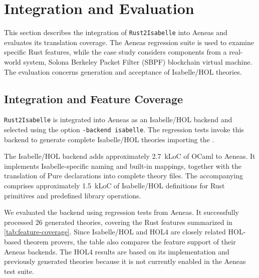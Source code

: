 \section{Integration and Evaluation}
\label{sec:evaluation}

This section describes the integration of \texttt{Rust2Isabelle} into Aeneas and evaluates its translation coverage.
The Aeneas regression suite is used to examine specific Rust features, while the case study considers components from a real-world system, Solona Berkeley Packet Filter (SBPF) blockchain virtual machine.
The evaluation concerns generation and acceptance of Isabelle/HOL theories.

\subsection{Integration and Feature Coverage}

\texttt{Rust2Isabelle} is integrated into Aeneas as an Isabelle/HOL backend and selected using the option \texttt{-backend isabelle}.
The regression tests invoke this backend to generate complete Isabelle/HOL theories importing the \rprelude{}.

The Isabelle/HOL backend adds approximately 2.7~kLoC of OCaml to Aeneas.
It implements Isabelle-specific naming and built-in mappings, together with the translation of Pure declarations into complete theory files.
The accompanying \rprelude{} comprises approximately 1.5~kLoC of Isabelle/HOL definitions for Rust primitives and predefined library operations.

We evaluated the backend using regression tests from Aeneas.
It successfully processed 26 generated theories, covering the Rust features summarized in \autoref{tab:feature-coverage}.
Since Isabelle/HOL and HOL4 are closely related HOL-based theorem provers, the table also compares the feature support of their Aeneas backends.
The HOL4 results are based on its implementation and previously generated theories because it is not currently enabled in the Aeneas test suite.

